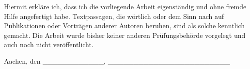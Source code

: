 Hiermit erkläre ich, dass ich die vorliegende Arbeit eigenständig und
ohne fremde Hilfe angefertigt habe. Textpassagen, die wörtlich oder dem
Sinn nach auf Publikationen oder Vorträgen anderer Autoren beruhen, sind
als solche kenntlich gemacht. Die Arbeit wurde bisher keiner anderen
Prüfungsbehörde vorgelegt und auch noch nicht veröffentlicht.

Aachen, den \datum  \_\_\_\_\_\_\_\_\_\_\_\_,
\_\_\_\_\_\_\_\_\_\_\_\_\_\_\_\_\_\_\_\_\_\_\_\_
